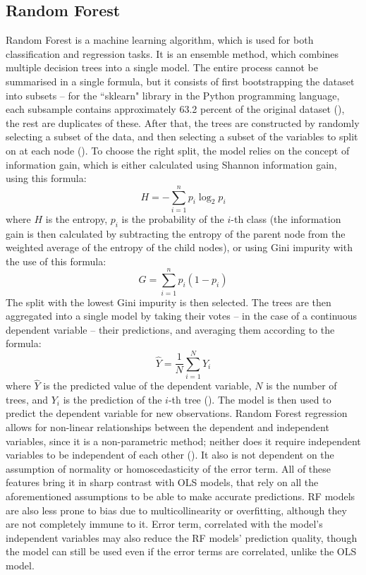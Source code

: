 \documentclass[12pt]{report}
\begin{document}
\subsection{Random Forest}
Random Forest is a machine learning algorithm, which is used for both classification and regression tasks. It is an ensemble method, which combines multiple decision trees into a single model. The entire process cannot be summarised in a single formula, but it consists of first bootstrapping the dataset into subsets -- for the ``sklearn" library in the Python programming language, each subsample contains approximately 63.2 percent of the original dataset (\cite{Steorts15}), the rest are duplicates of these. After that, the trees are constructed by randomly selecting a subset of the data, and then selecting a subset of the variables to split on at each node (\cite[p.160]{cutler2011}). To choose the right split, the model relies on the concept of information gain, which is either calculated using Shannon information gain, using this formula:
\begin{equation}
	H = -\sum_{i=1}^{n} p_i \log_2 p_i
\end{equation}
where $H$ is the entropy, $p_i$ is the probability of the $i$-th class (the information gain is then calculated by subtracting the entropy of the parent node from the weighted average of the entropy of the child nodes), or using Gini impurity with the use of this formula:
\begin{equation}
	G = \sum_{i=1}^{n} p_i (1 - p_i)
\end{equation}
The split with the lowest Gini impurity is then selected. The trees are then aggregated into a single model by taking their votes -- in the case of a continuous dependent variable -- their predictions, and averaging them according to the formula:
\begin{equation}
	\hat{Y} = \frac{1}{N} \sum_{i=1}^{N} Y_i
\end{equation}
where $\hat{Y}$ is the predicted value of the dependent variable, $N$ is the number of trees, and $Y_i$ is the prediction of the $i$-th tree (\cite[p. 159]{cutler2011}). The model is then used to predict the dependent variable for new observations.
Random Forest regression allows for non-linear relationships between the dependent and independent variables, since it is a non-parametric method; neither does it require independent variables to be independent of each other (\cite{Stekhoven2011}). It also is not dependent on the assumption of normality or homoscedasticity of the error term. All of these features bring it in sharp contrast with OLS models, that rely on all the aforementioned assumptions to be able to make accurate predictions. RF models are also less prone to bias due to multicollinearity or overfitting, although they are not completely immune to it. Error term, correlated with the model's independent variables may also reduce the RF models' prediction quality, though the model can still be used even if the error terms are correlated, unlike the OLS model.
\end{document}
